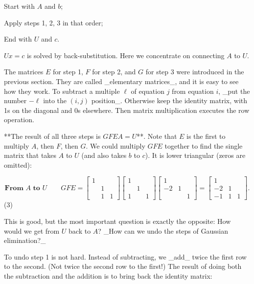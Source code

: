 Start with \(A\) and \(b\);

Apply steps 1, 2, 3 in that order;

End with \(U\) and \(c\).

\(Ux=c\) is solved by back-substitution. Here we concentrate on connecting \(A\) to \(U\).

The matrices \(E\) for step 1, \(F\) for step 2, and \(G\) for step 3 were introduced in the previous section. They are called _elementary matrices_, and it is easy to see how they work. To subtract a multiple \(\ell\) of equation \(j\) from equation \(i\), _put the number \(-\ell\) into the \((i,j)\) position_. Otherwise keep the identity matrix, with 1s on the diagonal and 0s elsewhere. Then matrix multiplication executes the row operation.

**The result of all three steps is \(GFEA=U\)**. Note that \(E\) is the first to multiply \(A\), then \(F\), then \(G\). We could multiply \(GFE\) together to find the single matrix that takes \(A\) to \(U\) (and also takes \(b\) to \(c\)). It is lower triangular (zeros are omitted):

\[\textbf{From }A\textbf{ to }U\qquad GFE=\begin{bmatrix}1&&\\ &1&\\ &1&1\end{bmatrix}\begin{bmatrix}1&&\\ &1&\\ 1&&1\end{bmatrix}\begin{bmatrix}1&&\\ -2&1&\\ &&1\end{bmatrix}=\begin{bmatrix}1&&\\ -2&1&\\ -1&1&1\end{bmatrix}.\] (3)

This is good, but the most important question is exactly the opposite: How would we get from \(U\) back to \(A\)? _How can we undo the steps of Gaussian elimination?_

To undo step 1 is not hard. Instead of subtracting, we _add_ twice the first row to the second. (Not twice the second row to the first!) The result of doing both the subtraction and the addition is to bring back the identity matrix:

